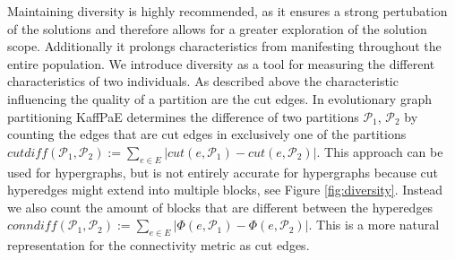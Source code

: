 \documentclass[a4paper,12pt,titlepage, BCOR7mm,headsepline]{scrbook}
\numberwithin{equation}{section}
\begin{document}
Maintaining diversity is highly recommended\cite{back1996evolutionary}, as it ensures a strong pertubation of the solutions and therefore allows for a greater exploration of the solution scope.
Additionally it prolongs characteristics from manifesting throughout the entire population.
We introduce diversity as a tool for measuring the different characteristics of two individuals. 
As described above the characteristic influencing the quality of a partition are the cut edges. In evolutionary graph partitioning KaffPaE \cite{sanders2012distributed} determines the difference of two partitions $\mathcal{P}_1$, $\mathcal{P}_2$ by counting the edges that are cut edges in exclusively one of the partitions $cutdiff(\mathcal{P}_1,\mathcal{P}_2) :=\sum_{e \in E} |cut(e,\mathcal{P}_1) - cut(e,\mathcal{P}_2)|$. This approach can be used for hypergraphs, but is not entirely accurate for hypergraphs because cut hyperedges might extend into multiple blocks, see Figure \ref{fig:diversity}. Instead we also count the amount of blocks that are different between the hyperedges $conndiff(\mathcal{P}_1,\mathcal{P}_2) :=\sum_{e \in E} |\Phi(e,\mathcal{P}_1) - \Phi(e,\mathcal{P}_2)|$. This is a more natural representation for the connectivity metric as cut edges.
\end{document}
